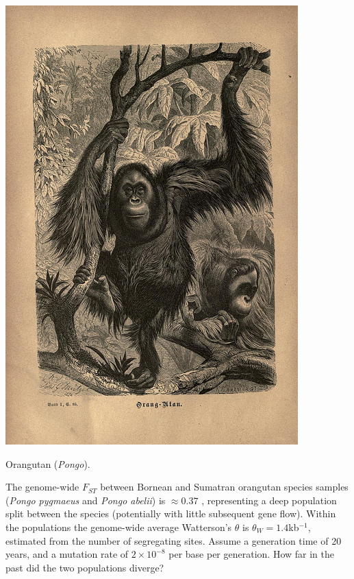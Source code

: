 \begin{marginfigure}
\begin{center}
\includegraphics[width= 0.8 \textwidth]{illustration_images/Genetic_drift/Orang/7971889392_d32b45668b_z.jpg}
\end{center}
\caption{Orangutan ({\it Pongo}). } \label{fig:Orang}
\end{marginfigure}


\begin{question}{}  %
  The genome-wide $F_{ST}$ between Bornean and Sumatran orangutan species samples  ({\it Pongo pygmaeus} and {\it Pongo abelii}) is $\approx 0.37$ \citep{locke2011}, representing a deep population split between the species (potentially with little subsequent gene flow). Within the populations the genome-wide average Watterson's $\theta$ is $\theta_W=1.4$kb$^{-1}$, estimated from the number of segregating sites. Assume a generation time of 20 years, and a mutation rate of $2 \times 10^{-8}$ per base per generation. How far in the past did the two populations diverge?
\end{question}



